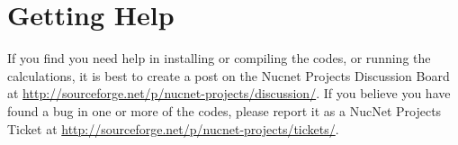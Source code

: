\section*{Getting Help}

If you find you need help in installing or compiling the codes, or running the 
calculations, it is best to create a post on the Nucnet Projects Discussion 
Board at \url{http://sourceforge.net/p/nucnet-projects/discussion/}.  If you 
believe you have found a bug in one or more of the codes, please report it as a 
NucNet Projects Ticket at 
\url{http://sourceforge.net/p/nucnet-projects/tickets/}.

